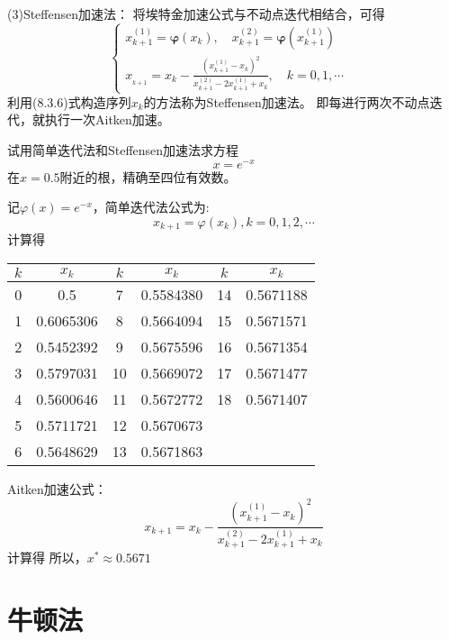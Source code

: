 (3)Steffensen加速法：
将埃特金加速公式与不动点迭代相结合，可得
\begin{equation*}
    \begin{cases}
        x_{k+1}^{(1)}=\boldsymbol{\varphi}(x_k),\quad x_{k+1}^{(2)}=\boldsymbol{\varphi}(x_{k+1}^{(1)})\\
        x_{_{k+1}}=x_k-\frac{\left(x_{k+1}^{(1)}-x_k\right)^2}{x_{k+1}^{(2)}-2x_{k+1}^{(1)}+x_k},\quad k=0,1,\cdots&
    \end{cases}
\end{equation*}
利用(8.3.6)式构造序列${x_k}$的方法称为Steffensen加速法。
即每进行两次不动点迭代，就执行一次Aitken加速。

\begin{example}
    试用简单迭代法和Steffensen加速法求方程
    \begin{equation*}
        x = e^{-x}
    \end{equation*}
    在$x = 0.5$附近的根，精确至四位有效数。
\end{example}

\begin{solution}
    记$\varphi(x) = e^{-x}$，简单迭代法公式为:\[x_{k+1} = \varphi(x_k),k = 0,1,2,\cdots\]
    计算得
    
    \begin{table}[h!]
        \begin{tabular}{|c|c|c|c|c|c|}
            \hline
            $k$&$x_k$&$k$&$x_k$&$k$&$x_k$\\
            \hline
            0&0.5&7&0.5584380&14&0.5671188\\
            1&0.6065306&8&0.5664094&15&0.5671571\\
            2&0.5452392&9&0.5675596&16&0.5671354\\
            3&0.5797031&10&0.5669072&17&0.5671477\\
            4&0.5600646&11&0.5672772&18&0.5671407\\
            5&0.5711721&12&0.5670673&&\\
            6&0.5648629&13&0.5671863&&\\
            \hline
        \end{tabular}
    \end{table}

    Aitken加速公式：\[x_{k+1}=x_k-\frac{\left(x_{k+1}^{(1)}-x_k\right)^2}{x_{k+1}^{(2)}-2x_{k+1}^{(1)}+x_k}\]
    计算得%
    所以，$x^* \approx 0.5671$
\end{solution}

\section{牛顿法}

